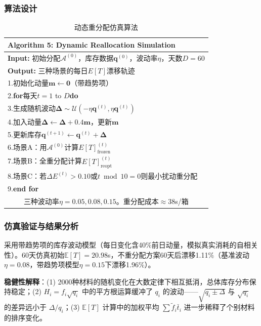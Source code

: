 \documentclass[a4paper]{cumcmthesis}
\newcommand{\headcol}{\rowcolor{tableheadcolor}}
\newcommand{\E}[1]{\mathbb{E}\left[#1\right]}
\newcommand{\ftilde}{\tilde{f}}
\begin{document}
\FloatBarrier\subsubsection{算法设计}

\begin{table}[htbp]
\centering\footnotesize
\caption{动态重分配仿真算法}
\label{tab:algo5}
\begin{tabular}{p{}}
\toprule
\headcol \textbf{Algorithm 5: Dynamic Reallocation Simulation}\\
\midrule
\textbf{Input:} 初始分配$\mathcal{A}^{(0)}$，库存数据$\mathbf{q}^{(0)}$，波动率$\eta$，天数$D=60$\\
\textbf{Output:} 三种场景的每日$E[T]$漂移轨迹\\
\midrule
1.\quad 初始化动量$\mathbf{m}\gets\mathbf{0}$（带趋势项）\\
2.\quad \textbf{for}每天$t=1$ to $D$\textbf{do}\\
3.\quad\qquad 生成随机波动$\bm{\Delta}\sim\mathcal{U}(-\eta\mathbf{q}^{(t)},\eta\mathbf{q}^{(t)})$\\
4.\quad\qquad 加入动量$\bm{\Delta}\gets\bm{\Delta}+0.4\mathbf{m}$，更新$\mathbf{m}$\\
5.\quad\qquad 更新库存$\mathbf{q}^{(t+1)}\gets\mathbf{q}^{(t)}+\bm{\Delta}$\\
6.\quad\qquad 场景A：用$\mathcal{A}^{(0)}$计算$E[T]^{(t)}_{\text{frozen}}$\\
7.\quad\qquad 场景B：全重分配计算$E[T]^{(t)}_{\text{reopt}}$\\
8.\quad\qquad 场景C：若$\Delta E^{(t)}>0.10$或$t\bmod 10=0$则最小扰动重分配\\
9.\quad \textbf{end for}\\
\midrule
\multicolumn{1}{c}{三种波动率$\eta=0.05,0.08,0.15$。重分配成本$\approx 38$s/箱}\\
\bottomrule
\end{tabular}
\end{table}

\FloatBarrier\subsubsection{仿真验证与结果分析}

采用带趋势项的库存波动模型（每日变化含40\%前日动量，模拟真实消耗的自相关性）。60天仿真初始$\E{T}=20.98$s，不重分配方案60天后漂移1.11\%（基准波动$\eta=0.08$，带趋势项模型$\eta=0.15$下漂移1.96\%）。

\textbf{稳健性解释}：(1) 2000种材料的随机变化在大数定律下相互抵消，总体库存分布保持稳定；(2) $H_i=f_i\sqrt{q_i}$ 中的平方根运算缓冲了 $q_i$ 的波动——$\sqrt{q_i\pm\Delta}$ 与 $\sqrt{q_i}$ 的差异远小于 $\Delta/q_i$；(3) $\mathbb{E}[T]$ 计算中的加权平均 $\sum\ftilde_i\bar{t}_i$ 进一步稀释了个别材料的排序变化。
\end{document}
